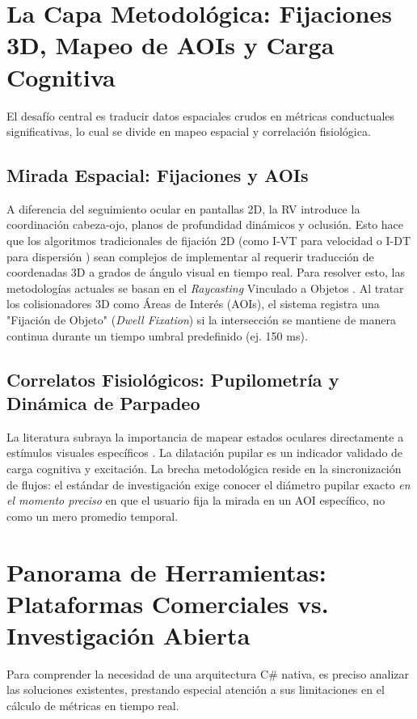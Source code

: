 \documentclass[12pt,a4paper]{article}
\begin{document}
\section{La Capa Metodológica: Fijaciones 3D, Mapeo de AOIs y Carga Cognitiva}

El desafío central es traducir datos espaciales crudos en métricas conductuales significativas, lo cual se divide en mapeo espacial y correlación fisiológica.

\subsection{Mirada Espacial: Fijaciones y AOIs}
A diferencia del seguimiento ocular en pantallas 2D, la RV introduce la coordinación cabeza-ojo, planos de profundidad dinámicos y oclusión. Esto hace que los algoritmos tradicionales de fijación 2D (como I-VT para velocidad o I-DT para dispersión \cite{salvucci2000}) sean complejos de implementar al requerir traducción de coordenadas 3D a grados de ángulo visual en tiempo real. Para resolver esto, las metodologías actuales se basan en el \textit{Raycasting} Vinculado a Objetos \cite{duchowski2017}. Al tratar los colisionadores 3D como Áreas de Interés (AOIs), el sistema registra una "Fijación de Objeto" (\textit{Dwell Fixation}) si la intersección se mantiene de manera continua durante un tiempo umbral predefinido (ej. 150 ms).

\subsection{Correlatos Fisiológicos: Pupilometría y Dinámica de Parpadeo}
La literatura subraya la importancia de mapear estados oculares directamente a estímulos visuales específicos \cite{eckstein2017}. La dilatación pupilar es un indicador validado de carga cognitiva y excitación. La brecha metodológica reside en la sincronización de flujos: el estándar de investigación exige conocer el diámetro pupilar exacto \textit{en el momento preciso} en que el usuario fija la mirada en un AOI específico, no como un mero promedio temporal.

\section{Panorama de Herramientas: Plataformas Comerciales vs. Investigación Abierta}

Para comprender la necesidad de una arquitectura C\# nativa, es preciso analizar las soluciones existentes, prestando especial atención a sus limitaciones en el cálculo de métricas en tiempo real.
\end{document}
